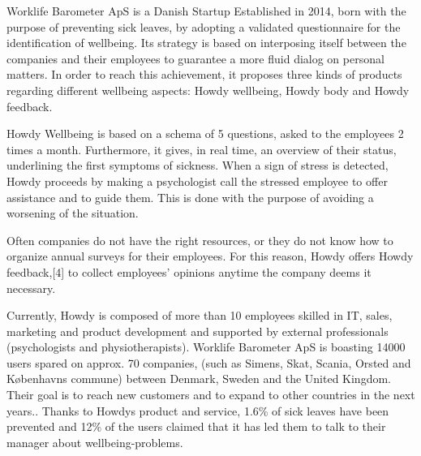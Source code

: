 


Worklife Barometer ApS is a Danish Startup Established in 2014, born with the purpose of preventing sick leaves, by adopting a validated questionnaire for the identification of wellbeing. Its strategy is based on interposing itself between the companies and their employees to guarantee a more fluid dialog on personal matters.     
In order to reach this achievement, it proposes three kinds of products regarding different wellbeing aspects: Howdy wellbeing, Howdy body and Howdy feedback.\cite{howdywebsite}

\noindent Howdy Wellbeing is based on a schema of 5 questions, asked to the employees 2 times a month.
Furthermore, it gives, in real time, an overview of their status, underlining the first symptoms of sickness.
When a sign of stress is detected, Howdy proceeds by making a psychologist call the stressed employee to offer assistance and to guide them. This is done with the purpose of avoiding a worsening of the situation.

\noindent Often companies do not have the right resources, or they do not know how to organize annual surveys for their employees. For this reason, Howdy offers Howdy feedback,[4] to collect employees’ opinions anytime the company deems it necessary.

\noindent Currently, Howdy is composed of more than 10 employees skilled in IT, sales, marketing and product development and supported by external professionals (psychologists and physiotherapists). Worklife Barometer ApS is boasting 14000 users spared on approx. 70 companies, (such as Simens, Skat, Scania, Orsted and Københavns commune) between Denmark, Sweden and the United Kingdom. Their goal is to reach new customers and to expand to other countries in the next years.\cite{howdywebsite}. Thanks to Howdys product and service, 1.6\% of sick leaves have been prevented and 12\% of the users claimed that it has led them to talk to their manager about wellbeing-problems. \cite{howdywebsite}  

